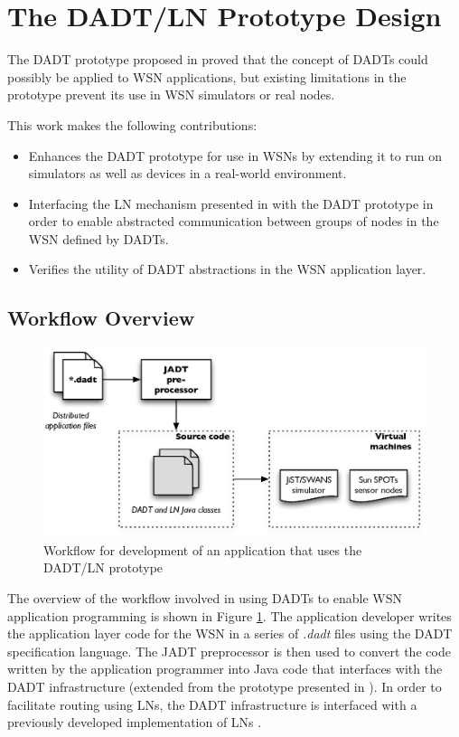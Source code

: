 \section{The DADT/LN Prototype Design} \label{sec:PrototypeDesign}

The DADT prototype proposed in \cite{migliavacca_DADT:2006} proved that the
concept of DADTs could possibly be applied to WSN
applications, but existing limitations in the prototype prevent its use in WSN simulators or real nodes.

This work makes the following contributions:

\begin{itemize}
  \item Enhances the DADT prototype for use in WSNs by extending it to run
  on simulators as well as devices in a real-world environment.
  \item Interfacing the LN mechanism presented in \cite{mottola_LNAbstraction} with the DADT prototype in order
  to enable abstracted communication between groups of nodes in the WSN defined
  by DADTs.
  \item  Verifies the utility of DADT abstractions in the WSN
  application layer.
\end{itemize}

\subsection{Workflow Overview} \label{subsec:overview}
\begin{figure}
\centering
\includegraphics[width=\textwidth]{img/DADTLN_workflow.eps} 
\caption[DADT/LN application workflow]{Workflow for development of an application that uses
the DADT/LN prototype}
\label{Fig:DADTLN_workflow}
\end{figure} 
The overview of the workflow involved in using DADTs to enable WSN application
programming is shown in Figure \ref{Fig:DADTLN_workflow}. The application
developer writes the application layer code for the WSN  in a series of \emph{.dadt} files using the DADT
specification language. The JADT preprocessor is then used to convert the code written by the
application programmer into Java code that interfaces with the DADT infrastructure (extended from the prototype presented in \cite{migliavacca_DADT:2006}). In order to facilitate routing using LNs, the DADT infrastructure is interfaced with a
previously developed implementation of LNs \cite{mottola_LNAbstraction}. 

